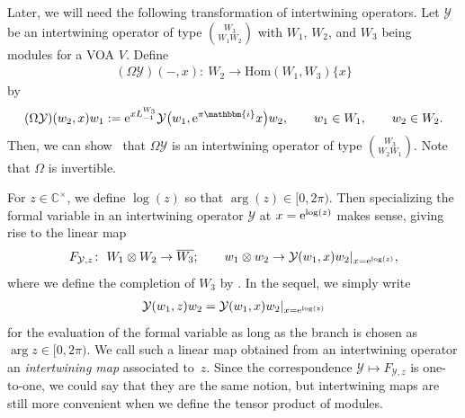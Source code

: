 \documentclass[pdftex]{sigma}
\numberwithin{equation}{section}
\newcommand{\ol}[1]{\overline{#1}}
\newcommand{\Hom}{\mathrm{Hom}}
\newcommand{\bC}{\mathbb{C}}
\newcommand{\bZ}{\mathbb{Z}}
\newcommand{\bbmi}{\mathbbm{i}}
\newcommand{\voagen}{V}
\newcommand{\voamodgen}{W}
\newcommand{\voaint}{\mathcal{Y}}
\newcommand{\inttyp}[3]{\binom{#3}{#1 #2}}
\newcommand{\intmap}{F}
\newcommand{\vmodvec}{w}
\begin{document}
Later, we will need the following transformation of intertwining operators.
Let $\voaint$ be an intertwining operator of type $\inttyp{\voamodgen_{1}}{\voamodgen_{2}}{\voamodgen_{3}}$ with $\voamodgen_{1}$, $\voamodgen_{2}$, and $\voamodgen_{3}$ being modules for a VOA $\voagen$.
Define
\begin{gather}
 (\Omega\voaint)(-,x)\colon\ \voamodgen_{2}\to\Hom (\voamodgen_{1},\voamodgen_{3})\{x\}\label{eq:int_flip}
\end{gather}
by
\begin{gather*}
 (\Omega\voaint)(\vmodvec_{2},x)\vmodvec_{1}:={\rm e}^{xL^{\voamodgen_{3}}_{-1}}\voaint\big(\vmodvec_{1},{\rm e}^{\pi\bbmi}x\big)\vmodvec_{2},\qquad \vmodvec_{1}\in\voamodgen_{1}, \qquad \vmodvec_{2}\in\voamodgen_{2}.
\end{gather*}
Then, we can show~\cite[Proposition~7.1]{Huang--LepowskyII} that $\Omega\voaint$ is an intertwining operator of type $\inttyp{\voamodgen_{2}}{\voamodgen_{1}}{\voamodgen_{3}}$.
Note that $\Omega$ is invertible.

For $z\in\bC^{\times}$, we define $\log (z)$ so that $\arg (z)\in [0,2\pi)$.
Then specializing the formal variable in an intertwining operator $\voaint$ at $x={\rm e}^{\log (z)}$ makes sense, giving rise to the linear map
\begin{gather*}
 \intmap_{\voaint,z}\colon\ \voamodgen_{1}\otimes\voamodgen_{2}\to\ol{\voamodgen_{3}};\qquad \vmodvec_{1}\otimes\vmodvec_{2}\to \voaint (\vmodvec_{1},x)\vmodvec_{2}|_{x={\rm e}^{\log (z)}},
\end{gather*}
where we define the completion of $\voamodgen_{3}$ by \smash{$\ol{\voamodgen_{3}}=\prod_{n\in\bZ_{\geq 0}}(\voamodgen_{3})_{n}$}.
In the sequel, we simply write
\begin{gather*}
 \voaint (\vmodvec_{1},z)\vmodvec_{2}=\voaint (\vmodvec_{1},x)\vmodvec_{2}|_{x={\rm e}^{\log (z)}}
\end{gather*}
for the evaluation of the formal variable as long as the branch is chosen as $\arg z\in [0,2\pi)$.
We call such a linear map obtained from an intertwining operator an {\it intertwining map} associated to~$z$.
Since the correspondence $\voaint\mapsto \intmap_{\voaint,z}$ is one-to-one, we could say that they are the same notion, but intertwining maps are still more convenient when we define the tensor product of modules.
\end{document}
